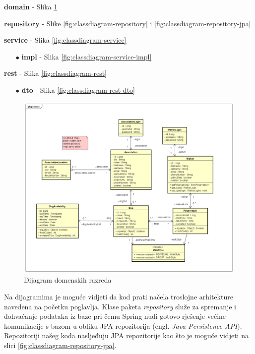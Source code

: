 			\begin{packed_item}
				\item[$\bullet$]  \textbf{domain} - Slika \ref{fig:classdiagram-domain}
				\item[$\bullet$]  \textbf{repository} - Slike \ref{fig:classdiagram-repository} i \ref{fig:classdiagram-repository-jpa}
				\item[$\bullet$]  \textbf{service} - Slika \ref{fig:classdiagram-service}
				    \begin{itemize}
				            \item[$\bullet$] \textbf{impl} - Slika \ref{fig:classdiagram-service-impl}
				    \end{itemize}
				\item[$\bullet$]  \textbf{rest} - Slika \ref{fig:classdiagram-rest}
				    \begin{itemize}
				        \item[$\bullet$] \textbf{dto} - Slika \ref{fig:classdiagram-rest-dto}
				    \end{itemize}
			\end{packed_item} 
			
			
			\begin{figure}[H]
    			    \includegraphics[scale=0.38]{dijagrami/classdiagram-domain.png}
    			    \centering
    			    \caption{Dijagram domenskih razreda}
    			    \label{fig:classdiagram-domain}
		    \end{figure}
		    
		    \noindent Na dijagramima je moguće vidjeti da kod prati načela troslojne arhitekture navedena na početku poglavlja. Klase paketa \textit{repository} služe za spremanje i dohvaćanje podataka iz baze pri čemu Spring nudi gotovo rješenje većine komunikacije s bazom u obliku JPA repozitorija (engl. \textit{Java Persistence API}). Repozitoriji našeg koda nasljeđuju JPA repozitorije kao što je moguće vidjeti na slici \ref{fig:classdiagram-repository-jpa}.
		    
